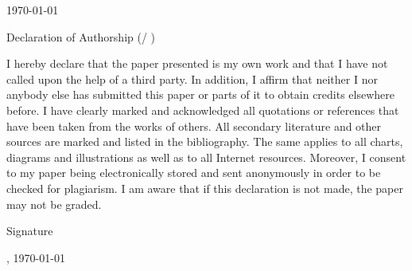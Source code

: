 \documentclass[
    12pt	%
    ]{article}
\begin{document}
  
\begin{titlepage}
\begin{center}

{\Large \EMBAATitle}
\vspace{1cm}

{\large \EMBALecturer}
\vspace{2cm}

{\EMBATestType}
\vspace{1cm}

{\EMBAParticipant}
\vspace{1cm}

{\EMBAClass}
\vspace{1cm}

\today

\vspace{2cm}

Declaration of Authorship (\EMBACourse / \EMBAATitle)
\vspace{0.5cm}

I hereby declare that the paper presented is my own work and that I
have not called upon the help of a third party. In addition, I affirm
that neither I nor anybody else has submitted this paper or parts of
it to obtain credits elsewhere before. I have clearly marked and
acknowledged all quotations or references that have been taken from
the works of others. All secondary literature and other sources are
marked and listed in the bibliography. The same applies to all charts,
diagrams and illustrations as well as to all Internet
resources. Moreover, I consent to my paper being electronically stored
and sent anonymously in order to be checked for plagiarism.  I am
aware that if this declaration is not made, the paper may not be
graded.

\vspace{1cm}
Signature

\vspace{2cm}
{\EMBAParticipant}

{\EMBALocation, \today}

\end{center}

\end{titlepage}
\end{document}
